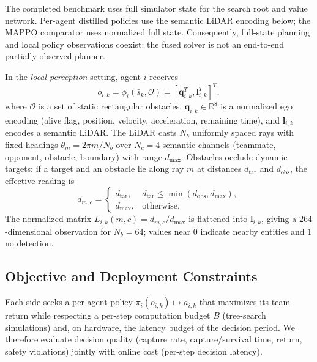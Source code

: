 \documentclass[letterpaper,10pt,conference]{ieeeconf}
\begin{document}
The completed benchmark uses full simulator state for the search root
and value network. Per-agent distilled policies use the semantic LiDAR
encoding below; the MAPPO comparator uses normalized full state.
Consequently, full-state planning and local policy observations coexist: 
the fused solver is not an end-to-end partially observed planner.

In the \emph{local-perception} setting, agent $i$ receives
\begin{equation}
o_{i,k}=\phi_i(\bar s_k,\mathcal O)
=[\mathbf q_{i,k}^{T},\mathbf l_{i,k}^{T}]^{T},
\end{equation}
where $\mathcal{O}$ is a set of static rectangular obstacles,
$\mathbf{q}_{i,k}\in\mathbb{R}^8$ is a normalized ego encoding (alive
flag, position, velocity, acceleration, remaining time), and
$\mathbf{l}_{i,k}$ encodes a semantic LiDAR. The LiDAR casts $N_b$
uniformly spaced rays with fixed headings $\theta_m=2\pi m/N_b$ over
$N_c=4$ semantic channels (teammate, opponent, obstacle, boundary) with
range $d_{\max}$. Obstacles occlude dynamic targets: if a target and an
obstacle lie along ray $m$ at distances $d_{\mathrm{tar}}$ and
$d_{\mathrm{obs}}$, the effective reading is
\begin{equation}
d_{m,c} =
\begin{cases}
d_{\mathrm{tar}}, & d_{\mathrm{tar}} \le \min(d_{\mathrm{obs}}, d_{\max}),\\
d_{\max}, & \text{otherwise}.
\end{cases}
\end{equation}
The normalized matrix $L_{i,k}(m,c)=d_{m,c}/d_{\max}$ is flattened into
$\mathbf{l}_{i,k}$, giving a $264$-dimensional observation for
$N_b=64$; values near $0$ indicate nearby entities and $1$ no
detection.

\subsection{Objective and Deployment Constraints}

Each side seeks a per-agent policy
$\pi_i(o_{i,k})\mapsto a_{i,k}$ that maximizes its team return while
respecting a per-step computation budget $B$ (tree-search simulations)
and, on hardware, the latency budget of the decision period. We therefore
evaluate decision quality (capture rate, capture/survival time, return,
safety violations) jointly with online cost (per-step decision latency).

\end{document}
